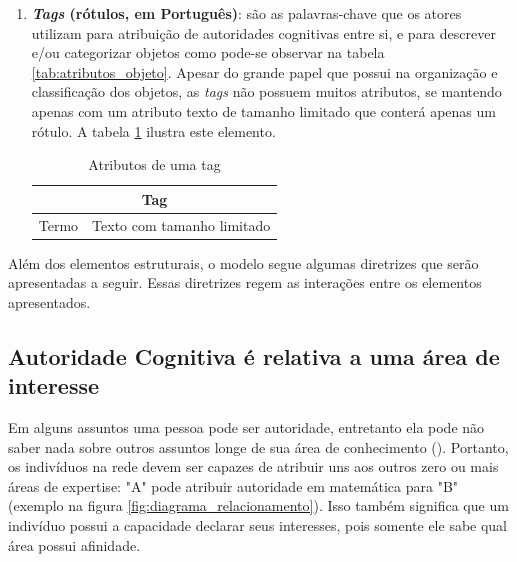 \begin{enumerate}
    \item \textbf{\emph{Tags} (rótulos, em Português)}: são as palavras-chave que os atores utilizam para atribuição de autoridades cognitivas entre si, e para descrever e/ou categorizar objetos como pode-se observar na tabela \ref{tab:atributos_objeto}. 
    Apesar do grande papel que possui na organização e classificação dos objetos, as \emph{tags} não possuem muitos atributos, se mantendo apenas com um atributo texto de tamanho limitado que conterá apenas um rótulo. A tabela \ref{tab:atributos_tag} ilustra este elemento.
    \begin{center}
        \begin{table}[!htp]
            \centering
            \caption{Atributos de uma tag}
            \label{tab:atributos_tag}
            \begin{tabular}{|p{4cm}|p{5cm}|}
                \cline{1-2}
                \multicolumn{2}{|c|}{Tag}  \\
                \hline
                Termo & Texto com tamanho limitado\\
                \hline
            \end{tabular}
        \end{table}    
    \end{center}
\end{enumerate}

Além dos elementos estruturais, o modelo segue algumas diretrizes que serão apresentadas a seguir. Essas diretrizes regem as interações entre os elementos apresentados.

\subsection{Autoridade Cognitiva é relativa a uma  área de interesse}

Em alguns assuntos uma pessoa pode ser autoridade, entretanto ela pode não saber nada sobre outros assuntos longe de sua área de conhecimento (\cite{Wilson1983}). Portanto, os indivíduos na rede devem ser capazes de atribuir uns aos outros zero ou mais áreas de expertise: "A" pode atribuir autoridade em matemática para "B" (exemplo na figura \ref{fig:diagrama_relacionamento}). Isso também significa que um indivíduo possui a capacidade declarar seus interesses, pois somente ele sabe qual área possui afinidade. 

